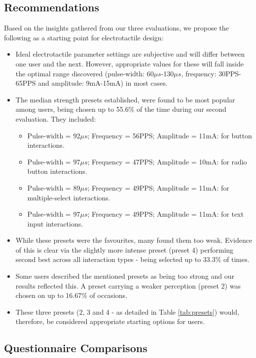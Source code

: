 \documentclass{mpaper}
\begin{document}
\subsection{Recommendations}
Based on the insights gathered from our three evaluations, we propose the following as a starting point for electrotactile design:
\begin{itemize}
    \item Ideal electrotactile parameter settings are subjective and will differ between one user and the next. However, appropriate values for these will fall inside the optimal range discovered (pulse-width: 60${\mu}s$-130${\mu}s$, frequency: 30PPS-65PPS and amplitude: 9mA-15mA) in most cases.
    \item The median strength presets established, were found to be most popular among users, being chosen up to 55.6\% of the time during our second evaluation. They included:
    \begin{itemize}
        \item Pulse-width = 92${\mu}s$; Frequency = 56PPS; Amplitude = 11mA: for button interactions.
        \item Pulse-width = 97${\mu}s$; Frequency = 47PPS; Amplitude = 10mA: for radio button interactions.
        \item Pulse-width = 89${\mu}s$; Frequency = 49PPS; Amplitude = 11mA: for multiple-select interactions.
        \item Pulse-width = 97${\mu}s$; Frequency = 49PPS; Amplitude = 11mA: for text input interactions.
    \end{itemize}
    \item While these presets were the favourites, many found them too weak. Evidence of this is clear via the slightly more intense preset (preset 4) performing second best across all interaction types - being selected up to 33.3\% of times.
    \item Some users described the mentioned presets as being too strong and our results reflected this. A preset carrying a weaker perception (preset 2) was chosen on up to 16.67\% of occasions.
    \item These three presets (2, 3 and 4 - as detailed in Table \ref{tab:presets}) would, therefore, be considered appropriate starting options for users.
\end{itemize}

\subsection{Questionnaire Comparisons}
\end{document}
